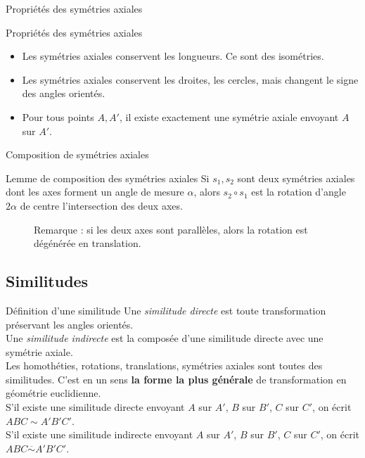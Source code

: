 \documentclass[french]{beamer}
\theoremstyle{plain}
\begin{document}
\begin{frame}{Propriétés des symétries axiales}
  \begin{exampleblock}{Propriétés des symétries axiales}
    \begin{itemize}
      \item Les symétries axiales conservent les longueurs. Ce sont des isométries.
      \item Les symétries axiales conservent les droites, les cercles, mais changent le signe des angles orientés.
      \item Pour tous points $ A, A'$, il existe exactement une symétrie axiale envoyant $A$ sur $A'$.
    \end{itemize}
  \end{exampleblock}
\end{frame}


\begin{frame}{Composition de symétries axiales}
  \begin{exampleblock}{Lemme de composition des symétries axiales}
    Si $ s_1, s_2 $ sont deux symétries axiales dont les axes forment un angle de mesure $ \alpha $, alors $ s_2 \circ s_1 $ est la rotation d'angle $ 2\alpha $ de centre l'intersection des deux axes.
  \end{exampleblock}
  \begin{figure}
    \centering
    \caption{Remarque : si les deux axes sont parallèles, alors la rotation est dégénérée en translation.}
  \end{figure}
\end{frame}


\subsection{Similitudes}
\begin{frame}{Définition d'une similitude}
  Une \textit{similitude directe} est toute transformation préservant les angles orientés. \\
  Une \textit{similitude indirecte} est la composée d'une similitude directe avec une symétrie axiale. \\
  Les homothéties, rotations, translations, symétries axiales sont toutes des similitudes. C'est en un sens \textbf{la forme la plus générale} de transformation en géométrie euclidienne. \\
  S'il existe une similitude directe envoyant $A$ sur $ A' $, $ B $ sur $ B' $, $ C $ sur $ C' $, on écrit $ ABC \sim A'B'C' $. \\
  S'il existe une similitude indirecte envoyant $A$ sur $ A' $, $ B $ sur $ B' $, $ C $ sur $ C' $, on écrit $ ABC \overline\sim A'B'C' $.
\end{frame}
\end{document}
